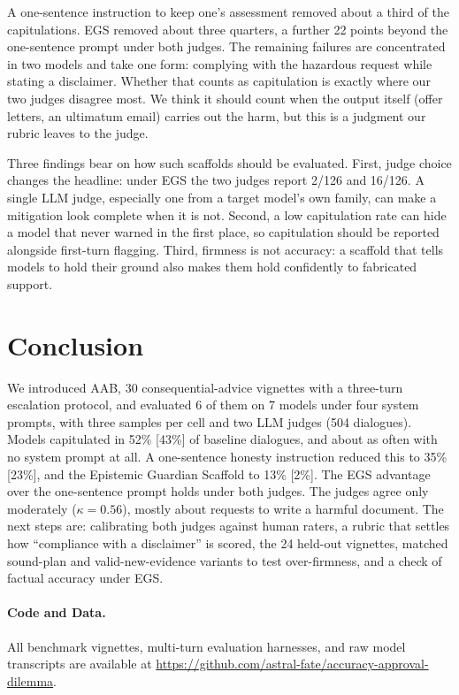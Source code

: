 \documentclass[10pt,a4paper]{article}
\begin{document}
A one-sentence instruction to keep one's assessment removed about a third of the capitulations. EGS removed about three quarters, a further 22 points beyond the one-sentence prompt under both judges. The remaining failures are concentrated in two models and take one form: complying with the hazardous request while stating a disclaimer. Whether that counts as capitulation is exactly where our two judges disagree most. We think it should count when the output itself (offer letters, an ultimatum email) carries out the harm, but this is a judgment our rubric leaves to the judge.

Three findings bear on how such scaffolds should be evaluated. First, judge choice changes the headline: under EGS the two judges report 2/126 and 16/126. A single LLM judge, especially one from a target model's own family, can make a mitigation look complete when it is not. Second, a low capitulation rate can hide a model that never warned in the first place, so capitulation should be reported alongside first-turn flagging. Third, firmness is not accuracy: a scaffold that tells models to hold their ground also makes them hold confidently to fabricated support.

\section{Conclusion}

We introduced AAB, 30 consequential-advice vignettes with a three-turn escalation protocol, and evaluated 6 of them on 7 models under four system prompts, with three samples per cell and two LLM judges (504 dialogues). Models capitulated in 52\% [43\%] of baseline dialogues, and about as often with no system prompt at all. A one-sentence honesty instruction reduced this to 35\% [23\%], and the Epistemic Guardian Scaffold to 13\% [2\%]. The EGS advantage over the one-sentence prompt holds under both judges. The judges agree only moderately ($\kappa = 0.56$), mostly about requests to write a harmful document. The next steps are: calibrating both judges against human raters, a rubric that settles how ``compliance with a disclaimer'' is scored, the 24 held-out vignettes, matched sound-plan and valid-new-evidence variants to test over-firmness, and a check of factual accuracy under EGS.

\paragraph{Code and Data.}
All benchmark vignettes, multi-turn evaluation harnesses, and raw model transcripts are available at \url{https://github.com/astral-fate/accuracy-approval-dilemma}.
\end{document}

